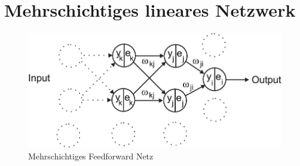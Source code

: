 \documentclass[12pt]{article}
\begin{document}
\section{Mehrschichtiges lineares Netzwerk}
\begin{figure}[!hbt]
\begin{center}
\mbox{\includegraphics[width=\textwidth]{multi_layer}}
\end{center}
\caption{Mehrschichtiges Feedforward Netz
\label{multi_layer}}
\end{figure}
\end{document}
